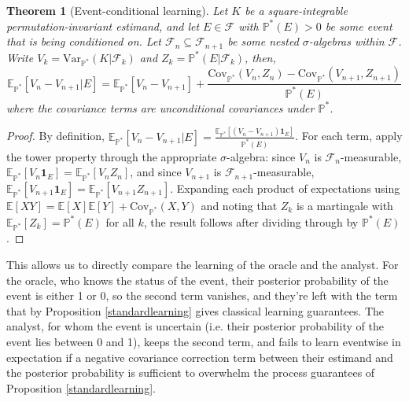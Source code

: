 \documentclass{article}
\newcommand{\Var}{\mathrm{Var}_{\mathbb{P}^*} }
\newcommand{\Cov}{\mathrm{Cov}_{\mathbb{P}^*} }
\newtheorem{theorem}{Theorem}
\begin{document}
\begin{theorem}[Event-conditional learning]
\label{eventconditionallearning}
Let $K$ be a square-integrable permutation-invariant estimand, and let $E\in \mathcal{F}$ with $\mathbb{P}^*(E)>0$ be some event that is being conditioned on. Let $\mathcal{F}_n\subseteq\mathcal{F}_{n+1}$ be some nested $\sigma$-algebras within $\mathcal{F}$. Write $V_k = \Var(K|\mathcal{F}_k)$ and $Z_k = \mathbb{P}^*(E|\mathcal{F}_k)$, then,
\[ \mathbb{E}_{\mathbb{P}^*}[V_n-V_{n+1}|E]=\mathbb{E}_{\mathbb{P}^*}[V_n-V_{n+1}]+\frac{\Cov(V_n,Z_n)-\Cov(V_{n+1},Z_{n+1})}{\mathbb{P}^*(E)}\]
where the covariance terms are unconditional covariances under $\mathbb P^*$.
\end{theorem}
\begin{proof}
    By definition, $\mathbb{E}_{\mathbb{P}^*}[V_n - V_{n+1}|E] = \frac{\mathbb{E}_{\mathbb{P}^*}[(V_n - V_{n+1})\mathbf{1}_E]}{\mathbb{P}^*(E)}$. For each term, apply the tower property through the appropriate $\sigma$-algebra: since $V_n$ is $\mathcal{F}_n$-measurable, $\mathbb{E}_{\mathbb{P}^*}[V_n \mathbf{1}_E] = \mathbb{E}_{\mathbb{P}^*}[V_n Z_n]$, and since $V_{n+1}$ is $\mathcal{F}_{n+1}$-measurable, $\mathbb{E}_{\mathbb{P}^*}[V_{n+1} \mathbf{1}_E] = \mathbb{E}_{\mathbb{P}^*}[V_{n+1} Z_{n+1}]$. Expanding each product of expectations using $\mathbb{E}[XY] = \mathbb{E}[X]\mathbb{E}[Y] + \Cov(X,Y)$ and noting that $Z_k$ is a martingale with $\mathbb{E}_{\mathbb{P}^*}[Z_k] = \mathbb{P}^*(E)$ for all $k$, the result follows after dividing through by $\mathbb{P}^*(E)$.
\end{proof}

This allows us to directly compare the learning of the oracle and the analyst. For the oracle, who knows the status of the event, their posterior probability of the event is either 1 or 0, so the second term vanishes, and they're left with the term that by Proposition \ref{standardlearning} gives classical learning guarantees. The analyst, for whom the event is uncertain (i.e. their posterior probability of the event lies between 0 and 1), keeps the second term, and fails to learn eventwise in expectation if a negative covariance correction term between their estimand and the posterior probability is sufficient to overwhelm the process guarantees of Proposition \ref{standardlearning}.
\end{document}
